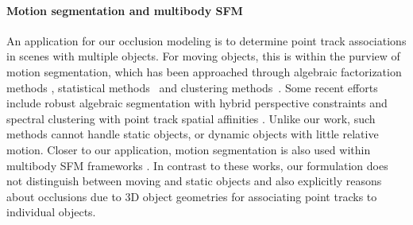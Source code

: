 

\vspace{-0.3cm}
\paragraph{Motion segmentation and multibody SFM}
An application for our occlusion modeling is to determine point track associations in scenes with multiple objects. For moving objects, this is within the purview of motion segmentation, which has been approached through algebraic factorization methods \cite{Costeria98,Vidal03,Vidal04}, statistical methods~\cite{Kanatani01,Gruber04,Rao08} and clustering methods~\cite{Yan06,Goh07}. Some recent efforts include robust algebraic segmentation with hybrid perspective constraints \cite{Rao_etal_2010} and spectral clustering with point track spatial affinities \cite{Brox_Malik_2010}. Unlike our work, such methods cannot handle static objects, or dynamic objects with little relative motion.
Closer to our application, motion segmentation is also used within multibody SFM frameworks \cite{Kundu_etal_2011,Namdev2012,Ozden_etal_2010}. In contrast to these works, our formulation does not distinguish between moving and static objects and also explicitly reasons about occlusions due to 3D object geometries for associating point tracks to individual objects.


